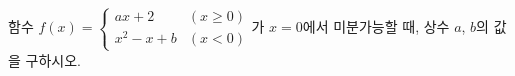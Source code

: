 함수 $f(x)=\begin{cases} ax+2 & (x\ge 0) \\ x^2-x+b & (x<0) \end{cases}$가 $x=0$에서 미분가능할 때, 상수 $a$, $b$의 값을 구하시오.
